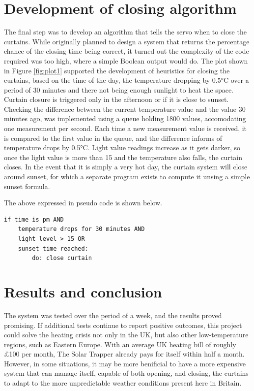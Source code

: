 \documentclass[a4paper,12pt]{article}
\begin{document}
\section{Development of closing algorithm}


The final step was to develop an algorithm that tells the servo when to close the curtains. 
While originally planned to design a system that returns the percentage chance of the closing time being correct,
it turned out the complexity of the code required was too high, where a simple Boolean output would do. 
The plot shown in Figure \ref{fig:plot1} supported the development of heuristics for closing the curtains, based on the time of the day, 
the temperature dropping by 0.5°C over a period of 30 minutes and there not being enough sunlight to heat the space.
Curtain closure is triggered only in the afternoon or if it is close to sunset. 
Checking the difference between the current temperature value and the value 30 minutes ago, was implemented using a queue holding 1800 values, 
accomodating one measurement per second. Each time a new measurement value is received, it is compared to the first value in the queue, 
and the difference informs of temperature drops by 0.5°C.
Light value readings increase as it gets darker, so once the light value is more than 15 and the temperature also falls, the curtain closes.
In the event that it is simply a very hot day, the curtain system will close around sunset, for which a separate program exists to compute it
unsing a simple sunset formula\cite{url:sunsetEquation}.

The above expressed in pseudo code is shown below.

\begin{verbatim}
if time is pm AND 
    temperature drops for 30 minutes AND 
    light level > 15 OR 
    sunset time reached: 
        do: close curtain
\end{verbatim}

\section{Results and conclusion}

The system was tested over the period of a week, and the results proved promising. If additional tests continue to report positive outcomes, this project could solve
the heating crisis not only in the UK, but also other low-temperature regions, such as Eastern Europe\cite{url:EasternEuropeDeathsFromCold}. 
With an average UK heating bill of roughly £100\cite{url:heatingBillsUK} per month, The Solar Trapper already pays for itself within half a month.
However, in some situations, it may be more benificial to have a more expensive system that can manage itself, capable of both opening, and closing, 
the curtains to adapt to the more unpredictable weather conditions present here in Britain.
\end{document}
